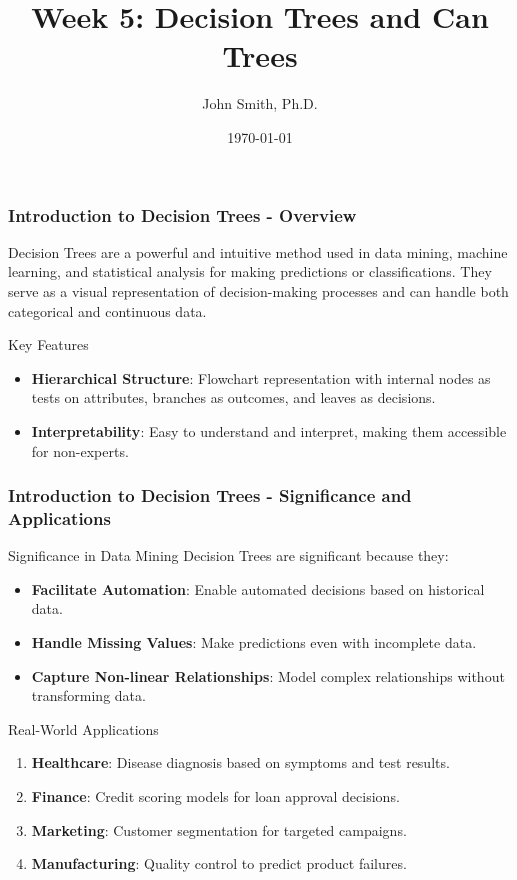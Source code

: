 \documentclass[aspectratio=169]{beamer}
\title[Decision Trees and Can Trees]{Week 5: Decision Trees and Can Trees}
\author[J. Smith]{John Smith, Ph.D.}
\institute[University Name]{
  Department of Computer Science\\
  University Name\\
  Email: email@university.edu\\
  Website: www.university.edu
}
\date{\today}
\begin{document}
\frame{\titlepage}

\begin{frame}[fragile]
    \frametitle{Introduction to Decision Trees - Overview}
    Decision Trees are a powerful and intuitive method used in data mining, machine learning, and statistical analysis for making predictions or classifications. 
    They serve as a visual representation of decision-making processes and can handle both categorical and continuous data.
    
    \begin{block}{Key Features}
        \begin{itemize}
            \item \textbf{Hierarchical Structure}: Flowchart representation with internal nodes as tests on attributes, branches as outcomes, and leaves as decisions.
            \item \textbf{Interpretability}: Easy to understand and interpret, making them accessible for non-experts.
        \end{itemize}
    \end{block}
\end{frame}

\begin{frame}[fragile]
    \frametitle{Introduction to Decision Trees - Significance and Applications}
    \begin{block}{Significance in Data Mining}
        Decision Trees are significant because they:
        \begin{itemize}
            \item \textbf{Facilitate Automation}: Enable automated decisions based on historical data.
            \item \textbf{Handle Missing Values}: Make predictions even with incomplete data.
            \item \textbf{Capture Non-linear Relationships}: Model complex relationships without transforming data.
        \end{itemize}
    \end{block}

    \begin{block}{Real-World Applications}
        \begin{enumerate}
            \item \textbf{Healthcare}: Disease diagnosis based on symptoms and test results.
            \item \textbf{Finance}: Credit scoring models for loan approval decisions.
            \item \textbf{Marketing}: Customer segmentation for targeted campaigns.
            \item \textbf{Manufacturing}: Quality control to predict product failures.
        \end{enumerate}
    \end{block}
\end{frame}
\end{document}
